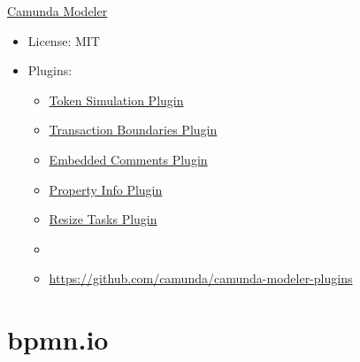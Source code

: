 \documentclass[12pt,aspectratio=169]{beamer}
\begin{document}
\begin{frame}{\href{https://camunda.com/download/modeler/}{Camunda Modeler}}
\begin{itemize}
\item License: MIT
\item Plugins:
\begin{itemize}
\item \href{https://github.com/camunda/camunda-modeler-token-simulation-plugin}{Token Simulation Plugin}
\item \href{https://github.com/camunda/camunda-modeler-plugins/tree/main/camunda-transaction-boundaries-plugin}{Transaction Boundaries Plugin}
\item \href{https://github.com/datakurre/camunda-modeler-embedded-comments-plugin}{Embedded Comments Plugin}
\item \href{https://github.com/mesoneer-ag/camunda-modeler-property-info-plugin}{Property Info Plugin}
\item \href{https://github.com/philippfromme/camunda-modeler-plugin-resize-tasks}{Resize Tasks Plugin}
\item[]
\item[] \href{https://github.com/camunda/camunda-modeler-plugins}{https://github.com/camunda/camunda-modeler-plugins}
\end{itemize}
\end{itemize}
\end{frame}



\section{bpmn.io}
\end{document}
